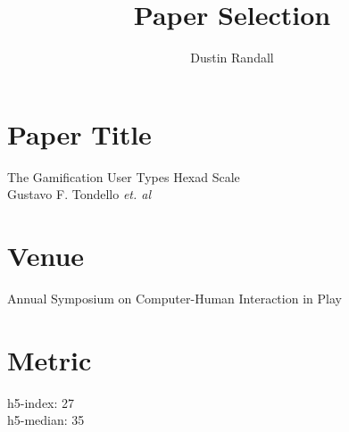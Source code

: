 \documentclass{article}
\begin{document}
\title{Paper Selection}
\author{Dustin Randall}
\date{}
\maketitle

\section{Paper Title}
The Gamification User Types Hexad Scale \\
Gustavo F. Tondello \emph{et. al}
\section{Venue}
Annual Symposium on Computer-Human Interaction in Play
\section{Metric}
h5-index: 27 \\
h5-median: 35
\end{document}
